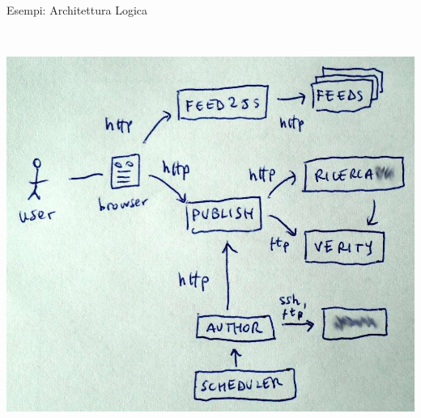 \begin{frame}{Esempi: Architettura Logica}
\begin{columns}[T]
\begin{column}{.5\textwidth}
				\\ \vspace*{0.2cm}
				\hspace*{0.2cm} \includegraphics[scale=0.13]{images/architecture-4}
		    \end{column}
		 \end{columns}
	\end{frame}

